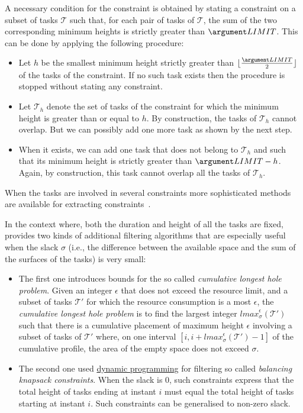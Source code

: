 \begin{ctrdesc}
A necessary condition for the  constraint is
obtained by stating a \hyperlink{Cdisjunctive}{}
constraint\marginpar{\bclampe} on a subset of tasks $\mathcal{T}$ such that, for each pair
of tasks of $\mathcal{T}$, the sum of the two corresponding minimum
heights is strictly greater than $\MLIMIT$.
This can be done by applying the following procedure:
\begin{itemize}
\item
Let $h$ be the smallest minimum height strictly greater than
$\lfloor\frac{\MLIMIT}{2}\rfloor$ of the tasks
of the  constraint.
If no such task exists then the procedure is stopped without stating
any \hyperlink{Cdisjunctive}{} constraint.
\item
Let $\mathcal{T}_h$ denote the set of tasks of the 
constraint for which the minimum height is greater than or equal to $h$.
By construction, the tasks of $\mathcal{T}_h$ cannot overlap.
But we can possibly add one more task as shown by the next step.
\item
When it exists, we can add one task that does not belong to
$\mathcal{T}_h$ and such that its minimum height is strictly greater
than $\MLIMIT-h$. Again, by construction, this task cannot overlap
all the tasks of $\mathcal{T}_h$.
\end{itemize}
When the tasks are involved in several  constraints
more sophisticated methods are available for extracting
\hyperlink{Cdisjunctive}{} constraints~\cite{BaptisteLePape00,BaptisteDemassey04}.

In the context where, both the duration and height of all the tasks are fixed,
\cite{BeldiceanuCarlssonPoder08} provides two kinds of additional filtering
algorithms that are especially useful when the slack $\sigma$ (i.e., the difference between
the available space and the sum of the surfaces of the tasks) is very small:
\begin{itemize}
\item
The first one introduces bounds for the so called \emph{cumulative longest hole problem}.
Given an integer $\epsilon$ that does not exceed the resource limit, and a subset of tasks $\mathcal{T}'$
for which the resource consumption is a most $\epsilon$, the \emph{cumulative longest hole problem}
is to find the largest integer $\mathit{lmax}_\sigma^\epsilon(\mathcal{T}')$ such that there is a cumulative
placement of maximum height $\epsilon$ involving a subset of tasks of $\mathcal{T}'$ where, on one
interval $[i,i+\mathit{lmax}_\sigma^\epsilon(\mathcal{T}')-1]$ of the cumulative profile, the area of the
empty space does not exceed $\sigma$.
\item
The second one used \hyperlink{dynamic_programming}{dynamic programming} for filtering
so called \emph{balancing knapsack constraints}. When the slack is $0$, such constraints
express that the total height of tasks ending at instant $i$ must equal the total height
of tasks starting at instant $i$. Such constraints can be generalised to non\nobreakdash-zero slack.
\end{itemize}


\end{ctrdesc}
